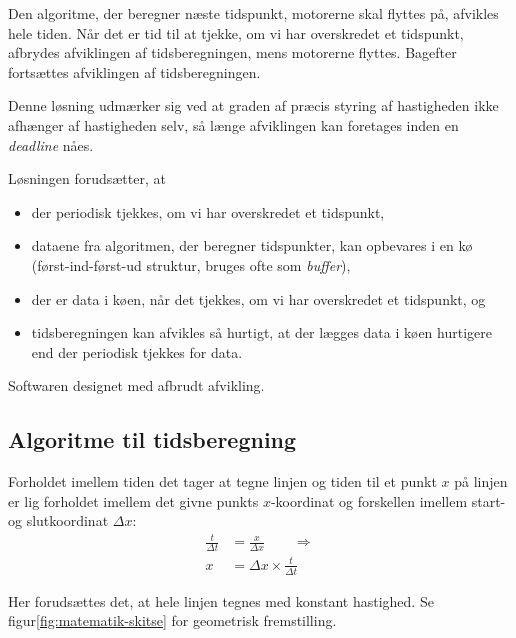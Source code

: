 Den algoritme, der beregner næste tidspunkt, motorerne skal flyttes
på, afvikles hele tiden. Når det er tid til at tjekke, om vi har
overskredet et tidspunkt, afbrydes afviklingen af tidsberegningen,
mens motorerne flyttes. Bagefter fortsættes afviklingen af
tidsberegningen. 

Denne løsning udmærker sig ved at graden af præcis styring af
hastigheden ikke afhænger af hastigheden selv, så længe afviklingen
kan foretages inden en \textit{deadline} nåes.

Løsningen forudsætter, at
\begin{itemize} \firmlist
\item der periodisk tjekkes, om vi har overskredet et tidspunkt,
\item dataene fra algoritmen, der beregner tidspunkter, kan opbevares
  i en kø (først-ind-først-ud struktur, bruges ofte som
  \textit{buffer}),
\item der er data i køen, når det tjekkes, om vi har overskredet et
  tidspunkt, og
\item tidsberegningen kan afvikles så hurtigt, at der lægges data i
  køen hurtigere end der periodisk tjekkes for data.
\end{itemize}

Softwaren designet med afbrudt afvikling.


\subsection{Algoritme til tidsberegning}


Forholdet imellem tiden det tager at tegne linjen og tiden til et
punkt $x$ på linjen er lig forholdet imellem det givne punkts $x$-koordinat
og forskellen imellem start- og slutkoordinat $\Delta x$:
\begin{align}
  \frac{t}{\Delta t} &= \frac{x}{\Delta x} \qquad \Rightarrow \nonumber \\
  x &= \Delta x \times \frac{t}{\Delta t} \label{eq:x-af-dxtdt}
\end{align}

Her forudsættes det, at hele linjen tegnes med konstant hastighed. Se
figur\vref{fig:matematik-skitse} for geometrisk fremstilling.

